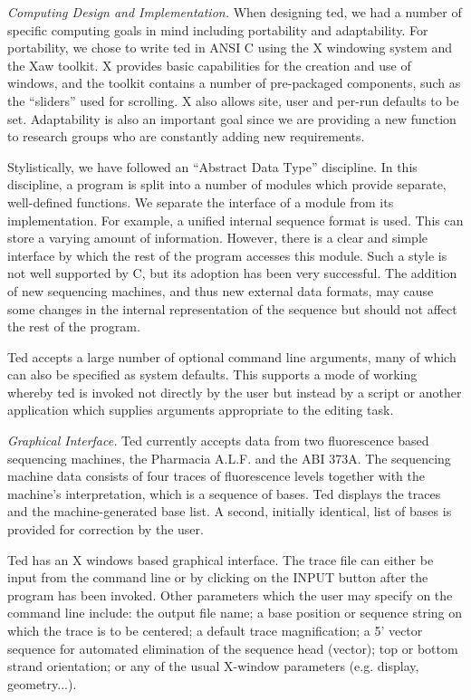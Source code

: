 {\em Computing Design and Implementation.}
When designing ted, we had a number of specific computing goals 
in mind including portability and adaptability.  For portability, we 
chose to write ted in ANSI C using the X windowing system and the 
Xaw toolkit.  X provides basic capabilities for the creation and use 
of windows, and the toolkit contains a number of pre-packaged 
components, such as the ``sliders'' used for scrolling. X also allows 
site, user and per-run defaults to be set.  Adaptability is also an 
important goal since we are providing a new function to 
research groups who are constantly adding new requirements.  

	Stylistically, we have followed an ``Abstract Data Type''
discipline.  In this discipline, a program is split into a number of 
modules which provide separate, well-defined functions.  We 
separate the interface of a module from its implementation.  For 
example, a unified internal sequence format is used.  This can store 
a varying amount of information.  However, there is a clear and 
simple interface by which the rest of the program accesses this 
module.  Such a style is not well supported by C, but its adoption has 
been very successful.  The addition of new sequencing machines, and 
thus new external data formats, may cause some changes in the 
internal representation of the sequence but should not affect  
the rest of the program.

	Ted accepts a large number of optional command line arguments,
many of which can also be specified as system defaults. This
supports a mode of working whereby ted is invoked not directly by the
user but instead by a script or another application which supplies
arguments appropriate to the editing task.


{\em Graphical Interface.}
Ted currently accepts data from two fluorescence based sequencing
machines, the Pharmacia A.L.F. and the ABI 373A.
The sequencing machine data consists of 
four traces of fluorescence levels together with the machine's 
interpretation, which is a sequence of bases.  
Ted displays 
the traces and the machine-generated base list.  
A second, initially identical, list of bases is provided for correction 
by the user.

	Ted has an X windows based 
graphical interface. The trace file
can either be input from the command line or by 
clicking on the INPUT button after the program has been invoked.  
Other parameters which the user may specify on the
command line include: the output 
file name; a base position or sequence string on which the trace is 
to be centered;  a default trace magnification;  a 5' vector sequence 
for automated elimination of the sequence head (vector); top or 
bottom strand orientation; or any of the usual X-window parameters (e.g. 
display, geometry...).

